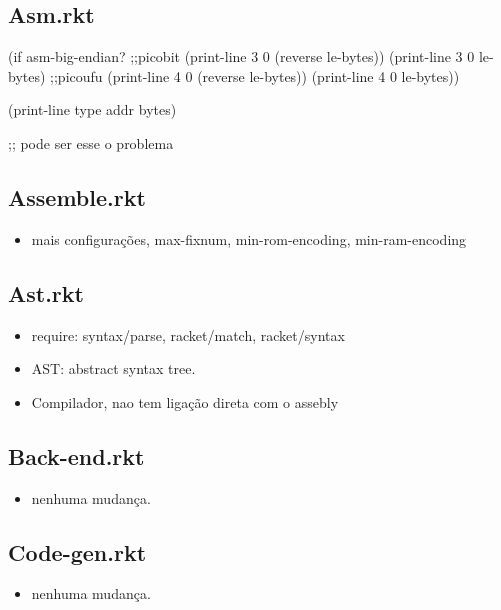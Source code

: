 \documentclass[11pt]{article}
\begin{document}
\subsection{Asm.rkt}
\label{sec-14-2}

(if asm-big-endian?
    ;;picobit
    (print-line 3 0 (reverse le-bytes))
    (print-line 3 0 le-bytes)
    ;;picoufu
    (print-line 4 0 (reverse le-bytes))
    (print-line 4 0 le-bytes))

(print-line type addr bytes) 

;; pode ser esse o problema

\subsection{Assemble.rkt}
\label{sec-14-3}

\begin{itemize}
\item mais configurações, max-fixnum, min-rom-encoding, min-ram-encoding
\end{itemize}

\subsection{Ast.rkt}
\label{sec-14-4}

\begin{itemize}
\item require: syntax/parse, racket/match, racket/syntax
\item AST: abstract syntax tree.
\item Compilador, nao tem ligação direta com o assebly
\end{itemize}

\subsection{Back-end.rkt}
\label{sec-14-5}

\begin{itemize}
\item nenhuma mudança.
\end{itemize}

\subsection{Code-gen.rkt}
\label{sec-14-6}

\begin{itemize}
\item nenhuma mudança.
\end{itemize}
\end{document}
